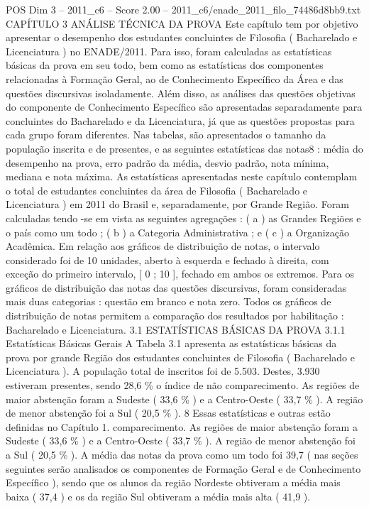 \begin{textsample}{POS Dim 3 – 2011\_c6 – Score 2.00 – 2011\_c6/enade\_2011\_filo\_74486d8bb9.txt}  \label{ex:f3_pos_205}
CAPÍTULO 3 ANÁLISE TÉCNICA DA PROVA Este capítulo tem por objetivo apresentar o desempenho dos estudantes concluintes de Filosofia ( Bacharelado e Licenciatura ) no ENADE/2011.
Para isso, foram calculadas as estatísticas básicas da prova em seu todo, bem como as estatísticas dos componentes relacionadas à Formação Geral, ao de Conhecimento Específico da Área e das questões discursivas isoladamente.
Além disso, as análises das questões objetivas do componente de Conhecimento Específico são apresentadas separadamente para concluintes do Bacharelado e da Licenciatura, já que as questões propostas para cada grupo foram diferentes.
Nas tabelas, são apresentados o tamanho da população inscrita e de presentes, e as seguintes estatísticas das notas8 : média do desempenho na prova, erro padrão da média, desvio padrão, nota mínima, mediana e nota máxima.
As estatísticas apresentadas neste capítulo contemplam o total de estudantes concluintes da área de Filosofia ( Bacharelado e Licenciatura ) em 2011 do Brasil e, separadamente, por Grande Região.
Foram calculadas tendo -se em vista as seguintes agregações : ( a ) as Grandes Regiões e o país como um todo ; ( b ) a Categoria Administrativa ; e ( c ) a Organização Acadêmica.
Em relação aos gráficos de distribuição de notas, o intervalo considerado foi de 10 unidades, aberto à esquerda e fechado à direita, com exceção do primeiro intervalo, [ 0 ; 10 ], fechado em ambos os extremos.
Para os gráficos de distribuição das notas das questões discursivas, foram consideradas mais duas categorias : questão em branco e nota zero.
Todos os gráficos de distribuição de notas permitem a comparação dos resultados por habilitação : Bacharelado e Licenciatura. 3.1 ESTATÍSTICAS BÁSICAS DA PROVA 3.1.1 Estatísticas Básicas Gerais A Tabela 3.1 apresenta as estatísticas básicas da prova por grande Região dos estudantes concluintes de Filosofia ( Bacharelado e Licenciatura ).
A população total de inscritos foi de 5.503.
Destes, 3.930 estiveram presentes, sendo 28,6 \% o índice de não comparecimento.
As regiões de maior abstenção foram a Sudeste ( 33,6 \% ) e a Centro-Oeste ( 33,7 \% ).
A região de menor abstenção foi a Sul ( 20,5 \% ). 8 Essas estatísticas e outras estão definidas no Capítulo 1. comparecimento.
As regiões de maior abstenção foram a Sudeste ( 33,6 \% ) e a Centro-Oeste ( 33,7 \% ).
A região de menor abstenção foi a Sul ( 20,5 \% ).
A média das notas da prova como um todo foi 39,7 ( nas seções seguintes serão analisados os componentes de Formação Geral e de Conhecimento Específico ), sendo que os alunos da região Nordeste obtiveram a média mais baixa ( 37,4 ) e os da região Sul obtiveram a média mais alta ( 41,9 ).

\end{textsample}
